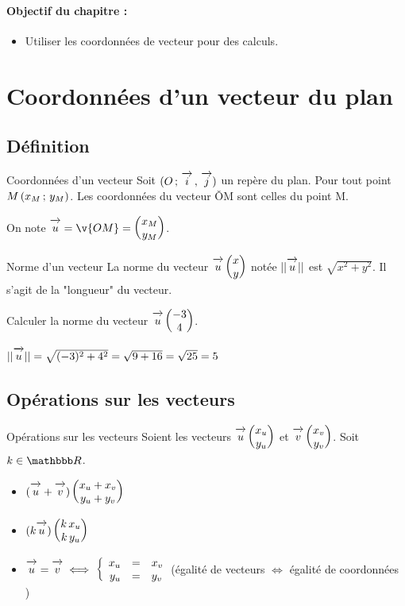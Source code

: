 \documentclass[10pt,a4paper,openany,twoside, prof]{book}
\begin{document}
\entetegal{}
\makeatletter
{} %
\makeatother

\paragraph*{Objectif du chapitre :}
\vspace{-3mm}
\begin{itemize}
	\item Utiliser les coordonnées de vecteur pour des calculs.
\end{itemize}
\vspace{-3mm}

\section{Coordonnées d'un vecteur du plan}
\subsection{Définition}
\begin{defi}{Coordonnées d'un vecteur}{}
	Soit $(O\,;\,\overrightarrow{\,\mathstrut i\,}\,,\,\overrightarrow{\,\mathstrut j\,})$ un repère du plan. Pour tout point $M\left(x_M\,;\,y_M\right)$. Les coordonnées du vecteur \v{OM} sont celles du point M.

	On note $\vecu=\v{OM}=\coordvp{x_M}{y_M}$.
\end{defi}

\begin{prop}{Norme d'un vecteur}{}
	La norme du vecteur $\overrightarrow{\,\mathstrut u\,} \begin{pmatrix}x\\y\end{pmatrix}$ notée $||\overrightarrow{\,\mathstrut u\,}||$ est $\sqrt{x^2+y^2}$. Il s'agit de la "longueur" du vecteur.
\end{prop}

\begin{ex}{}{}
	Calculer la norme du vecteur $\overrightarrow{\,\mathstrut u\,} \begin{pmatrix}-3\\4\end{pmatrix}$.
	\begin{reponse}
	$||\overrightarrow{\,\mathstrut u\,}||=\sqrt{(-3)^2+4^2}=\sqrt{9+16}=\sqrt{25}=5$
	\end{reponse}
\end{ex}
\subsection{Opérations sur les vecteurs}

\begin{prop}{Opérations sur les vecteurs}{}
	Soient les vecteurs $\overrightarrow{\,\mathstrut u\,} \begin{pmatrix}x_u\\y_u\end{pmatrix}$ et $\overrightarrow{\,\mathstrut v\,} \begin{pmatrix}x_v\\y_v\end{pmatrix}$. Soit $k\in\R$.

	\begin{itemize}
		\item $(\overrightarrow{\,\mathstrut u\,}+\overrightarrow{\,\mathstrut v\,}) \begin{pmatrix}x_u+x_v\\y_u+y_v\end{pmatrix}$
		\item $(k\overrightarrow{\,\mathstrut u\,}) \begin{pmatrix}k\, x_u\\k\, y_u\end{pmatrix}$
		\item $\overrightarrow{\,\mathstrut u\,}=\overrightarrow{\,\mathstrut v\,}\iff\left\{\begin{array}{rcl} x_u&=&x_v\\y_u&=&y_v \end{array}\right.$\quad (égalité de vecteurs $\iff$ égalité de coordonnées )
	\end{itemize}
\end{prop}
\end{document}
